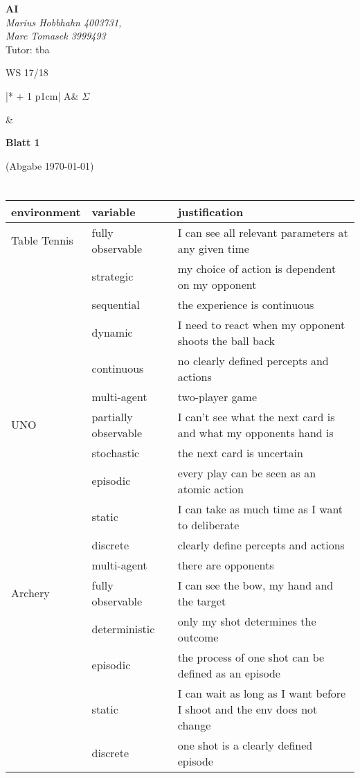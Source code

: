 \documentclass[a4paper,12pt]{scrartcl}
\newcounter{aufgabe}
\def\tand{&}
\newcommand{\makeTableLine}[2][0]{%
	\setcounter{aufgabe}{1}%
	\whiledo{\value{aufgabe} < #1}%
	{%
		#2\tand\stepcounter{aufgabe}%
	}
}
\newcommand{\aufgTable}[1]{
	\def\spalten{\numexpr #1 + 1 \relax}
	\begin{tabular}{|*{\spalten}{p{1cm}|}}
		\makeTableLine[\spalten]{A\theaufgabe}$\Sigma$~~\\ \hline
		\rule{0pt}{15pt}\makeTableLine[\spalten]{}\\
	\end{tabular}
}
\newcounter{n}
\def\header#1#2#3#4#5#6#7{\pagestyle{empty}
	\begin{minipage}[t]{0.47\textwidth}
		\begin{flushleft}
			{\textbf{ #4}}\\
			#5\\
			Tutor: tba
		\end{flushleft}
	\end{minipage}
	\begin{minipage}[t]{0.5\textwidth}
		\begin{flushright}
			#6 \vspace{0.5cm}\\
			\aufgTable{#7}
		\end{flushright}
	\end{minipage}
	\vspace{1cm}
	\begin{center}
		{\Large\textbf{ Blatt #1}}
		
		{(Abgabe #3)}
	\end{center}}
\newcommand{\heading}[3]{\header{#1}{}{#2}{AI}{\textit{Marius Hobbhahn 4003731, \\ Marc Tomasek 3999493}
		}{WS 17/18}{#3}
		\vspace{1cm}}
\renewcommand{\thesubsection}{(\alph{subsection})}
\begin{document}
	{}
	\titleformat{\subsection}[block]{}{}{0em}{\thesubsection \ }{}
	\heading{1}{\today}{3} %
	\pagestyle{scrheadings}
\section{}
	\begin{tabular}{l || l | l }
		environment & variable & justification \\ \hline
		Table Tennis & fully observable & I can see all relevant parameters at any given time \\
		& strategic & my choice of action is dependent on my opponent \\
		& sequential & the experience is continuous \\
		& dynamic & I need to react when my opponent shoots the ball back \\
		& continuous & no clearly defined percepts and actions \\
		& multi-agent & two-player game \\  \hline
		UNO & partially observable & I can't see what the next card is and what my opponents hand is \\
		& stochastic & the next card is uncertain \\
		& episodic & every play can be seen as an atomic action \\
		& static & I can take as much time as I want to deliberate \\
		& discrete & clearly define percepts and actions \\
		& multi-agent & there are opponents \\ \hline
		Archery & fully observable & I can see the bow, my hand and the target \\
		& deterministic & only my shot determines the outcome \\
		& episodic & the process of one shot can be defined as an episode \\
		& static & I can wait as long as I want before I shoot and the env does not change \\
		& discrete & one shot is a clearly defined episode \\

\end{tabular}
\end{document}
